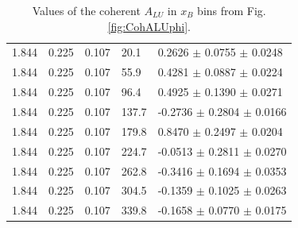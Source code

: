 \documentclass{article}
\begin{document}
\begin{table}[!h]
\begin{center}
\begin{tabular}{||l|l|l|l|l||}
  1.844 & 0.225 & 0.107 & 20.1  &  0.2626 $\pm$ 0.0755 $\pm$ 0.0248 \\
  1.844 & 0.225 & 0.107 & 55.9  &  0.4281 $\pm$ 0.0887 $\pm$ 0.0224 \\
  1.844 & 0.225 & 0.107 & 96.4  &  0.4925 $\pm$ 0.1390 $\pm$ 0.0271 \\
  1.844 & 0.225 & 0.107 & 137.7 & -0.2736 $\pm$ 0.2804 $\pm$ 0.0166 \\
  1.844 & 0.225 & 0.107 & 179.8 &  0.8470 $\pm$ 0.2497 $\pm$ 0.0204 \\
  1.844 & 0.225 & 0.107 & 224.7 & -0.0513 $\pm$ 0.2811 $\pm$ 0.0270 \\
  1.844 & 0.225 & 0.107 & 262.8 & -0.3416 $\pm$ 0.1694 $\pm$ 0.0353 \\
  1.844 & 0.225 & 0.107 & 304.5 & -0.1359 $\pm$ 0.1025 $\pm$ 0.0263 \\
  1.844 & 0.225 & 0.107 & 339.8 & -0.1658 $\pm$ 0.0770 $\pm$ 0.0175 \\
         
         \hline 
         \hline
      \end{tabular}
      \caption{Values of the coherent $A_{LU}$ in $x_B$ bins from Fig. \ref{fig:CohALUphi}.}
      \label{table:Coh_xB_BSA}
   \end{center}
\end{table}                        
\end{document}
